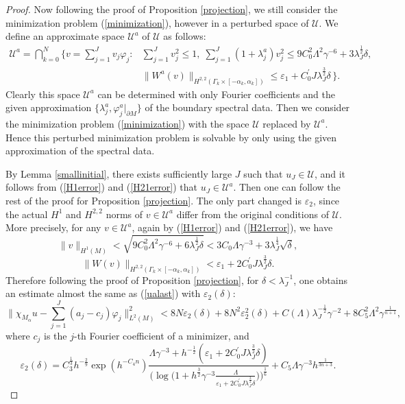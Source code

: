 \documentclass[11pt,letterpaper]{amsart}
\numberwithin{equation}{section}
\theoremstyle{definition}
\theoremstyle{plain}
\theoremstyle{definition}
\theoremstyle{plain}
\theoremstyle{definition}
\theoremstyle{plain}
\begin{document}
\begin{proof}
\smallskip
Now following the proof of Proposition \ref{projection}, we still consider the minimization problem (\ref{minimization}), however in a perturbed space of $\mathcal{U}$. We define an approximate space $\mathcal{U}^a$ of $\mathcal{U}$ as follows:
\begin{eqnarray*}
\mathcal{U}^{a}=\bigcap_{k=0}^ N \Big\{v=\sum_{j=1}^{J}v_j\varphi_j :& \sum_{j=1}^{J}v_j^2\leqslant 1,\; 
\sum_{j=1}^{J} (1+\lambda_j^a)v_j^2\leqslant 9C_0^2 \Lambda^2\gamma^{-6}+3\lambda_J^{\frac{1}{2}}\delta,\\
&\|W^a (v)\|_{H^{2,2}(\Gamma_{k}\times [-\alpha_k,\alpha_k])}\leqslant \varepsilon_1+C_0^{\prime}J\lambda_{J}^{\frac{3}{2}}\delta \, \Big\}.
\end{eqnarray*}
Clearly this space $\mathcal{U}^a$ can be determined with only Fourier coefficients and the given approximation $\{\lambda^a_j,\varphi^a_j|_{\partial M}\}$ of the boundary spectral data. Then we consider the minimization problem (\ref{minimization}) with the space $\mathcal{U}$ replaced by $\mathcal{U}^a$. Hence this perturbed minimization problem is solvable by only using the given approximation of the spectral data.

By Lemma \ref{smallinitial}, there exists sufficiently large $J$ such that $u_J\in\mathcal{U}$, and it follows from (\ref{H1error}) and (\ref{H21error}) that $u_{J}\in \mathcal{U}^a$. Then one can follow the rest of the proof for Proposition \ref{projection}. The only part changed is $\varepsilon_2$, since the actual $H^1$ and $H^{2,2}$ norms of $v\in\mathcal{U}^a$ differ from the original conditions of $\mathcal{U}$. More precisely, for any $v\in\mathcal{U}^a$, again by (\ref{H1error}) and (\ref{H21error}), we have
$$\|v\|_{H^1(M)}< \sqrt{9C_0^2 \Lambda^2\gamma^{-6}+6\lambda_J^{\frac{1}{2}}\delta}<3C_0 \Lambda\gamma^{-3}+3\lambda_J^{\frac{1}{4}}\sqrt{\delta},$$
$$\|W (v)\|_{H^{2,2}(\Gamma_{k}\times [-\alpha_k,\alpha_k])} < \varepsilon_1+2C_0^{\prime}J\lambda_{J}^{\frac{3}{2}}\delta.$$
Therefore following the proof of Proposition \ref{projection}, for $\delta<\lambda_J^{-1}$, one obtains an estimate almost the same as (\ref{ualast}) with $\varepsilon_2(\delta)$:
\begin{equation}\label{ualasterror}
\big\|\chi_{M_{\alpha}}u-\sum_{j=1}^{J}(a_j-c_j)\varphi_j \big\|^2_{L^2(M)} < 8N\varepsilon_2(\delta)+8N^2\varepsilon_2^2(\delta) +C(\Lambda) \lambda_{J}^{-\frac{1}{2}}\gamma^{-2}+ 8C_5^2\Lambda^2\gamma^{\frac{1}{n+1}},
\end{equation}
where $c_j$ is the $j$-th Fourier coefficient of a minimizer, and
\begin{equation*}
\varepsilon_2(\delta)=C_3^{\frac{1}{3}}h^{-\frac{2}{9}}\exp(h^{-C_4 n}) \frac{\Lambda\gamma^{-3}+h^{-\frac{1}{2}}(\varepsilon_1+2C_0^{\prime}J\lambda_{J}^{\frac{3}{2}}\delta)}{\bigg(\log \big(1+h^{\frac{3}{2}}\gamma^{-3}\frac{\Lambda}{\varepsilon_1+2C_0^{\prime}J\lambda_{J}^{\frac{3}{2}}\delta}\big)\bigg) ^{\frac{1}{6}}}+C_5\Lambda\gamma^{-3} h^{\frac{1}{3n+3}}.
\end{equation*}


\end{proof}
\end{document}

